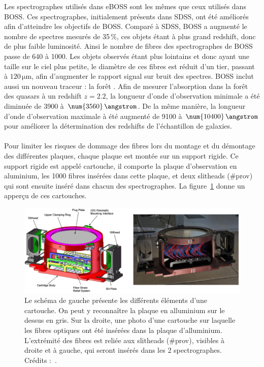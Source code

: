 \documentclass[11pt, twoside, a4paper, openright]{report}
\begin{document}
Les spectrographes utilisés dans eBOSS sont les mêmes que ceux utilisés dans BOSS. Ces spectrographes, initialement présents dans SDSS, ont été améliorés afin d'atteindre les objectifs de BOSS. Comparé à SDSS, BOSS a augmenté le nombre de spectres mesurés de 35\,\%, ces objets étant à plus grand redshift, donc de plus faible luminosité. Ainsi le nombre de fibres des spectrographes de BOSS passe de \num{640} à \num{1000}. Les objets observés étant plus lointains et donc ayant une taille sur le ciel plus petite, le diamètre de ces fibres est réduit d'un tier, passant à $120\,\mathrm{\mu m}$, afin d'augmenter le rapport signal sur bruit des spectres. BOSS inclut aussi un nouveau traceur : la forêt \lya. Afin de mesurer l'absorption dans la forêt \lya des quasars à un redshift $z=2.2$, la longueur d'onde d'observation minimale a été diminuée de \num{3900} à $\num{3560}\,\angstrom$. De la même manière, la longueur d'onde d'observation maximale à été augmenté de \num{9100} à $\num{10400}\,\angstrom$ pour améliorer la détermination des redshifts de l'échantillon de galaxies.

\paragraph{} Pour limiter les risques de dommage des fibres lors du montage et du démontage des différentes plaques, chaque plaque est montée sur un support rigide. Ce support rigide est appelé cartouche, il comporte la plaque d'observation en aluminium, les \num{1000} fibres insérées dans cette plaque, et deux slitheads (\#prov) qui sont ensuite inséré dans chacun des spectrographes. La figure~\ref{fig:CartoucheImage} donne un apperçu de ces cartouches.
\begin{figure}
  \centering
  \includegraphics[scale=0.35]{../img/eBOSS/CartoucheImage}
  \caption{Le schéma de gauche présente les différents éléments d'une cartouche. On peut y reconnaître la plaque en alluminium sur le dessus en gris. Sur la droite, une photo d'une cartouche sur laquelle les fibres optiques ont été insérées dans la plaque d'alluminium. L'extrémité des fibres est reliée aux slitheads (\#prov), visibles à droite et à gauche, qui seront insérés dans les 2 spectrographes. Crédits :~\cite{Smee2012}.}
  \label{fig:CartoucheImage}
\end{figure}
\end{document}
